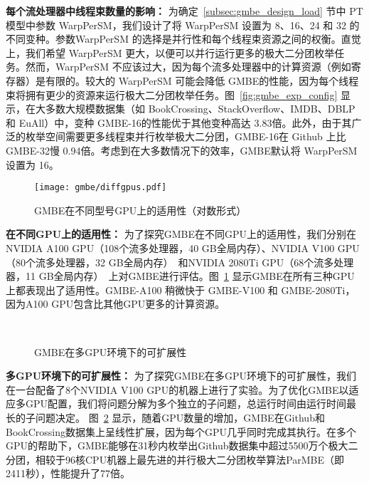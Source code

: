 \textbf{每个流处理器中线程束数量的影响：} 为确定~\ref{subsec:gmbe_design_load} 节中 PT 模型中参数 \textsf{WarpPerSM}，我们设计了将 \textsf{WarpPerSM} 设置为 8、16、24 和 32 的不同变种。参数\textsf{WarpPerSM} 的选择是并行性和每个线程束资源之间的权衡。直觉上，我们希望 \textsf{WarpPerSM} 更大，以便可以并行运行更多的极大二分团枚举任务。然而，\textsf{WarpPerSM} 不应该过大，因为每个流多处理器中的计算资源（例如寄存器）是有限的。较大的 \textsf{WarpPerSM} 可能会降低 GMBE的性能，因为每个线程束将拥有更少的资源来运行极大二分团枚举任务。图~\ref{fig:gmbe_exp_config} 显示，在大多数大规模数据集（如 BookCrossing、StackOverflow、IMDB、DBLP 和 EuAll）中，变种 GMBE-16的性能优于其他变种高达 3.83倍。此外，由于其广泛的枚举空间需要更多线程束并行枚举极大二分团，GMBE-16在 Github 上比 GMBE-32慢 0.94倍。考虑到在大多数情况下的效率，GMBE默认将 \textsf{WarpPerSM} 设置为 16。

\begin{figure} [H]
	\centering
	\texttt{[image: gmbe/diffgpus.pdf]}	
	\vspace{0.1in}
  \caption{GMBE在不同型号GPU上的适用性（对数形式）}
	\label{fig:gmbe_exp_diff}
\end{figure}

\textbf{在不同GPU上的适用性：} 为了探究GMBE在不同GPU上的适用性，我们分别在NVIDIA A100 GPU（108个流多处理器，40 GB全局内存）、NVIDIA V100 GPU（80个流多处理器，32 GB全局内存）~\cite{NVIDIA-V100}和NVIDIA 2080Ti GPU（68个流多处理器，11 GB全局内存）~\cite{NVIDIA-2080Ti}上对GMBE进行评估。图~\ref{fig:gmbe_exp_diff} 显示GMBE在所有三种GPU上都表现出了适用性。GMBE-A100 稍微快于 GMBE-V100 和 GMBE-2080Ti，因为A100 GPU包含比其他GPU更多的计算资源。

\begin{figure} [H]
	\centering

	 \\


	\caption{GMBE在多GPU环境下的可扩展性}

	\label{fig:gmbe_exp_scale}

\end{figure}

\textbf{多GPU环境下的可扩展性：} 为了探究GMBE在多GPU环境下的可扩展性，我们在一台配备了8个NVIDIA V100 GPU的机器上进行了实验。为了优化GMBE以适应多GPU配置，我们将问题分解为多个独立的子问题，总运行时间由运行时间最长的子问题决定。 图~\ref{fig:gmbe_exp_scale} 显示，随着GPU数量的增加，GMBE在Github和BookCrossing数据集上呈线性扩展，因为每个GPU几乎同时完成其执行。在多个GPU的帮助下，GMBE能够在31秒内枚举出Github数据集中超过5500万个极大二分团，相较于96核CPU机器上最先进的并行极大二分团枚举算法ParMBE（即2411秒），性能提升了77倍。


